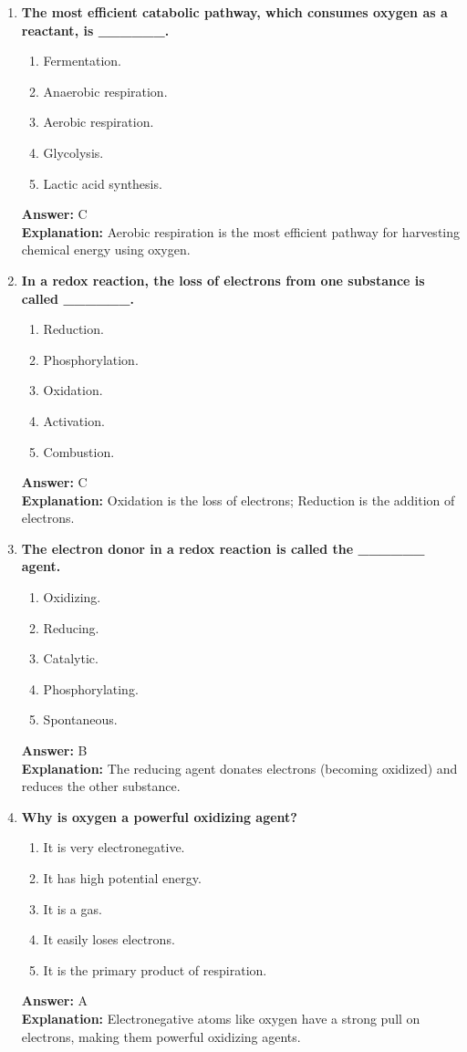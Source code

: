 \documentclass[11pt, a4paper]{article}
\begin{document}
\begin{enumerate}[leftmargin=*, label=\arabic*.]
\item \textbf{The most efficient catabolic pathway, which consumes oxygen as a reactant, is \_\_\_\_\_\_.}
\begin{enumerate}[label=\Alph*.]
    \item Fermentation.
    \item Anaerobic respiration.
    \item Aerobic respiration.
    \item Glycolysis.
    \item Lactic acid synthesis.
\end{enumerate}
\textbf{Answer:} C \\
\textbf{Explanation:} Aerobic respiration is the most efficient pathway for harvesting chemical energy using oxygen.

\item \textbf{In a redox reaction, the loss of electrons from one substance is called \_\_\_\_\_\_.}
\begin{enumerate}[label=\Alph*.]
    \item Reduction.
    \item Phosphorylation.
    \item Oxidation.
    \item Activation.
    \item Combustion.
\end{enumerate}
\textbf{Answer:} C \\
\textbf{Explanation:} Oxidation is the loss of electrons; Reduction is the addition of electrons.

\item \textbf{The electron donor in a redox reaction is called the \_\_\_\_\_\_ agent.}
\begin{enumerate}[label=\Alph*.]
    \item Oxidizing.
    \item Reducing.
    \item Catalytic.
    \item Phosphorylating.
    \item Spontaneous.
\end{enumerate}
\textbf{Answer:} B \\
\textbf{Explanation:} The reducing agent donates electrons (becoming oxidized) and reduces the other substance.

\item \textbf{Why is oxygen a powerful oxidizing agent?}
\begin{enumerate}[label=\Alph*.]
    \item It is very electronegative.
    \item It has high potential energy.
    \item It is a gas.
    \item It easily loses electrons.
    \item It is the primary product of respiration.
\end{enumerate}
\textbf{Answer:} A \\
\textbf{Explanation:} Electronegative atoms like oxygen have a strong pull on electrons, making them powerful oxidizing agents.


\end{enumerate}
\end{document}
